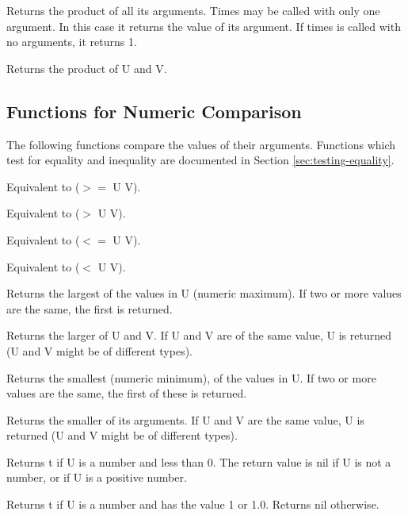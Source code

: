 {    Returns  the  product  of  all  its arguments.  Times may be
    called with only one argument.  In this case it returns  the
    value  of  its  argument.    If  times  is  called  with  no
    arguments, it returns 1.  }

{    Returns the product of U and V.
}
\subsection{Functions for Numeric Comparison}

  The following functions compare the values of their arguments.
Functions which test for equality and inequality are  documented
in Section \ref{sec:testing-equality}.


{    Equivalent to ($>=$ U V).  }

{    Equivalent to ($>$ U V).  }

{    Equivalent to ($<=$ U V).  }

{    Equivalent to ($<$ U V).  }

{    Returns  the  largest  of the values in U (numeric maximum).
    If two or more  values are the same, the first is returned.  }

{    Returns the larger of U and V.  If U and V are of  the  same
    value, U is returned (U and  V might be of different types).  }

{    Returns  the smallest (numeric minimum), of the values in U.
    If two or more  values are the same, the first of  these  is
    returned.  }

{    Returns  the  smaller of its arguments.  If U and V are  the
    same value,  U is  returned  (U  and    V  might    be    of
    different types).  }

{    Returns  t  if  U  is  a number and less than 0.  The return
    value is nil if U is not a number, or if  U  is  a  positive
    number.  }

{    Returns  t if  U is a  number and  has the value  1 or  1.0.
    Returns nil otherwise.  }

